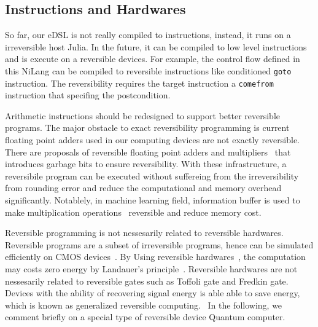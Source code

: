 \documentclass[aps,twocolumn,longbibliography,english,superscriptaddress]{revtex4-1}
\newcommand{\<}{\langle}
\renewcommand{\>}{\rangle}
\theoremstyle{definition}\newtheorem{definition}{\textit{Definition}}
\begin{document}
\subsection{Instructions and Hardwares}\label{sec:hardware}
So far, our eDSL is not really compiled to instructions, instead, it runs on a irreversible host Julia.
In the future, it can be compiled to low level instructions and is execute on a reversible devices.
For example, the control flow defined in this NiLang can be compiled to reversible instructions like conditioned \texttt{goto} instruction.
The reversibility requires the target instruction a \texttt{comefrom} instruction that specifing the postcondition. ~\cite{Vieri1999}

Arithmetic instructions should be redesigned to support better reversible programs.
The major obstacle to exact reversibility programming is current floating point adders used in our computing devices are not exactly reversible.
There are proposals of reversible floating point adders and multipliers~\cite{Nachtigal2010,Nachtigal2011,Nguyen2013,Hner2018} that introduces garbage bits to ensure reversibility.
With these infrastructure, a reversibile program can be executed without suffereing from the irreversibility from rounding error and reduce the computational and memory overhead significantly.
Notablely, in machine learning field, information buffer is used to make multiplication operations~\cite{Maclaurin2015} reversible and reduce memory cost.

Reversible programming is not nessesarily related to reversible hardwares. Reversible programs are a subset of irreversible programs, hence can be simulated efficiently on CMOS devices~\cite{Vieri1999}. By Using reversible hardwares~\cite{}, the computation may costs zero energy by Landauer's principle~\cite{Landauer1961}.
Reversible hardwares are not nessesarily related to reversible gates such as Toffoli gate and Fredkin gate.
Devices with the ability of recovering signal energy is able able to save energy, which is known as generalized reversible computing.~\cite{Frank2005,Frank2017b}
In the following, we comment briefly on a special type of reversible device Quantum computer.
\end{document}
